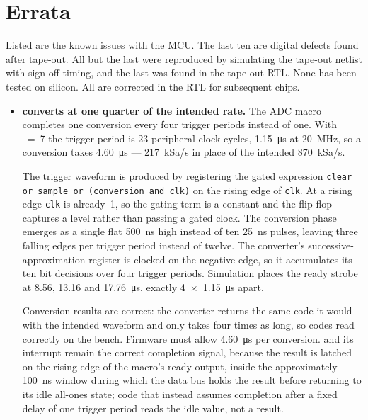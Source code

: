 \documentclass[11pt,pdftex,portrait,letterpaper]{article}
\begin{document}
\section{Errata} \label{s:errata}
Listed are the known issues with the {\AsicNameForUserGuide} MCU. The last ten are digital defects found after tape-out. All but the last were reproduced by simulating the tape-out netlist with sign-off timing, and the last was found in the tape-out RTL. None has been tested on silicon. All are corrected in the RTL for subsequent chips.

\begin{itemize}
	\item \textbf{ converts at one quarter of the intended rate.}
	The ADC macro completes one conversion every four trigger periods instead of one.
	With ~=~7 the trigger period is 23 peripheral-clock cycles,
	1.15~\si{\micro\second} at 20~\si{\mega\hertz}, so a conversion takes
	4.60~\si{\micro\second} --- 217~kSa/s in place of the intended 870~kSa/s.

	The trigger waveform is produced by registering the gated expression
	\texttt{clear or sample or (conversion and clk)} on the rising edge of \texttt{clk}.
	At a rising edge \texttt{clk} is already~1, so the gating term is a constant and the
	flip-flop captures a level rather than passing a gated clock. The conversion phase
	emerges as a single flat 500~\si{\nano\second} high instead of ten
	25~\si{\nano\second} pulses, leaving three falling edges per trigger period instead
	of twelve. The converter's successive-approximation register is clocked on the
	negative edge, so it accumulates its ten bit decisions over four trigger periods.
	Simulation places the ready strobe at 8.56, 13.16 and 17.76~\si{\micro\second},
	exactly 4~$\times$~1.15~\si{\micro\second} apart.

	Conversion results are correct: the converter returns the same code it would with the
	intended waveform and only takes four times as long, so codes read correctly on the
	bench. Firmware must allow 4.60~\si{\micro\second} per conversion.
	 and its interrupt remain the correct completion signal, because
	the result is latched on the rising edge of the macro's ready output, inside the
	approximately 100~\si{\nano\second} window during which the data bus holds the result
	before returning to its idle all-ones state; code that instead assumes completion after
	a fixed delay of one trigger period reads the idle value, not a result.


\end{itemize}
\end{document}
